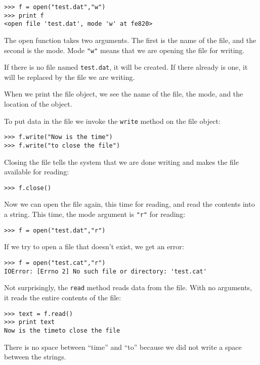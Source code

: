 \beforeverb
\begin{verbatim}
>>> f = open("test.dat","w")
>>> print f
<open file 'test.dat', mode 'w' at fe820>
\end{verbatim}
\afterverb
%
The open function takes two arguments.  The first is the name of the file,
and the second is the mode.  Mode {\tt "w"} means that we are opening
the file for writing.

If there is no file named {\tt test.dat}, it will be created.
If there already is one, it will be replaced by the file we are
writing.

When we print the file object, we see the name of the file, the
mode, and the location of the object.

To put data in the file we invoke the {\tt write} method on the
file object:

\beforeverb
\begin{verbatim}
>>> f.write("Now is the time")
>>> f.write("to close the file")
\end{verbatim}
\afterverb
%
Closing the file tells the system that we are done writing and
makes the file available for reading:

\beforeverb
\begin{verbatim}
>>> f.close()
\end{verbatim}
\afterverb
%
Now we can open the file again, this time for reading, and read the
contents into a string.  This time, the mode argument
is {\tt "r"} for reading:

\beforeverb
\begin{verbatim}
>>> f = open("test.dat","r")
\end{verbatim}
\afterverb
%
If we try to open a file that doesn't exist, we get an error:


\beforeverb
\begin{verbatim}
>>> f = open("test.cat","r")
IOError: [Errno 2] No such file or directory: 'test.cat'
\end{verbatim}
\afterverb
%
Not surprisingly, the {\tt read} method reads data from the
file.  With no arguments, it reads the entire contents of the file:

\beforeverb
\begin{verbatim}
>>> text = f.read()
>>> print text
Now is the timeto close the file
\end{verbatim}
\afterverb
%
There is no space between ``time'' and ``to'' because we did
not write a space between the strings.

